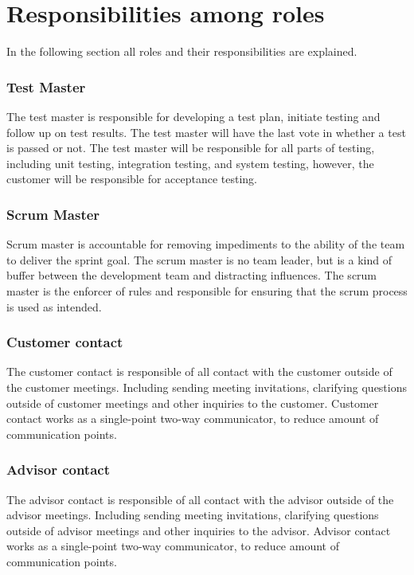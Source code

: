 \section{Responsibilities among roles}

In the following section all roles and their responsibilities are explained.

\subsubsection{Test Master}
The test master is responsible for developing a test plan, initiate testing 
and follow up on test results. The test master will have the last vote in 
whether a test is passed or not. The test master will be responsible for all 
parts of testing, including unit testing, integration testing, and system 
testing, however, the customer will be responsible for acceptance testing.

\subsubsection{Scrum Master}
Scrum master is accountable for removing impediments to the ability of the team 
to deliver the sprint goal. The scrum master is no team leader, but is a kind 
of buffer between the development team and distracting influences. The scrum master 
is the enforcer of rules and responsible for ensuring that the scrum process is 
used as intended.

\subsubsection{Customer contact}
The customer contact is responsible of all contact with the customer outside 
of the customer meetings. Including sending meeting invitations, clarifying 
questions outside of customer meetings and other inquiries to the customer. 
Customer contact works as a single-point two-way communicator, to reduce 
amount of communication points. 

\subsubsection{Advisor contact}
The advisor contact is responsible of all contact with the advisor outside 
of the advisor meetings. Including sending meeting invitations, clarifying 
questions outside of advisor meetings and other inquiries to the advisor. Advisor 
contact works as a single-point two-way communicator, to reduce amount of 
communication points.

